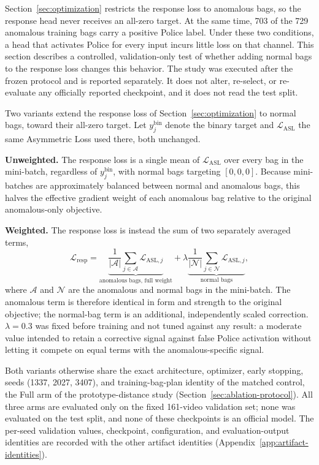 Section~\ref{sec:optimization} restricts the response loss to anomalous bags,
so the response head never receives an all-zero target. At the same time,
703 of the 729 anomalous training bags carry a positive Police label. Under
these two conditions, a head that activates Police for every input incurs
little loss on that channel. This section describes a controlled,
validation-only test of whether adding normal bags to the response loss
changes this behavior. The study was executed after the frozen protocol and
is reported separately. It does not alter, re-select, or re-evaluate any
officially reported checkpoint, and it does not read the test split.

Two variants extend the response loss of Section~\ref{sec:optimization} to
normal bags, toward their all-zero target. Let $y_j^{\mathrm{bin}}$ denote the
binary target and $\mathcal{L}_{\mathrm{ASL}}$ the same Asymmetric Loss used
there, both unchanged.

\textbf{Unweighted.} The response loss is a single mean of
$\mathcal{L}_{\mathrm{ASL}}$ over every bag in the mini-batch, regardless of
$y_j^{\mathrm{bin}}$, with normal bags targeting $[0,0,0]$. Because
mini-batches are approximately balanced between normal and anomalous bags,
this halves the effective gradient weight of each anomalous bag relative to
the original anomalous-only objective.

\textbf{Weighted.} The response loss is instead the sum of two
separately averaged terms,
\begin{equation}
    \mathcal{L}_{\mathrm{resp}}
    = \underbrace{\frac{1}{|\mathcal{A}|}\sum_{j\in\mathcal{A}}\mathcal{L}_{\mathrm{ASL},j}}_{\text{anomalous bags, full weight}}
    + \lambda\underbrace{\frac{1}{|\mathcal{N}|}\sum_{j\in\mathcal{N}}\mathcal{L}_{\mathrm{ASL},j}}_{\text{normal bags}},
    \label{eq:reweighted-resp-loss}
\end{equation}
where $\mathcal{A}$ and $\mathcal{N}$ are the anomalous and normal bags in the
mini-batch. The anomalous term is therefore identical in form and strength to
the original objective; the normal-bag term is an additional, independently
scaled correction. $\lambda=0.3$ was fixed before training and not tuned
against any result: a moderate value intended to retain a corrective signal
against false Police activation without letting it compete on equal terms
with the anomalous-specific signal.

Both variants otherwise share the exact architecture, optimizer, early
stopping, seeds (1337, 2027, 3407), and training-bag-plan identity of the
matched control, the Full arm of the
prototype-distance study (Section~\ref{sec:ablation-protocol}). All three arms
are evaluated only on the fixed 161-video validation set; none was evaluated
on the test split, and none of these checkpoints is an official model. The
per-seed validation values, checkpoint, configuration, and evaluation-output
identities are recorded with the other artifact identities
(Appendix~\ref{app:artifact-identities}).

